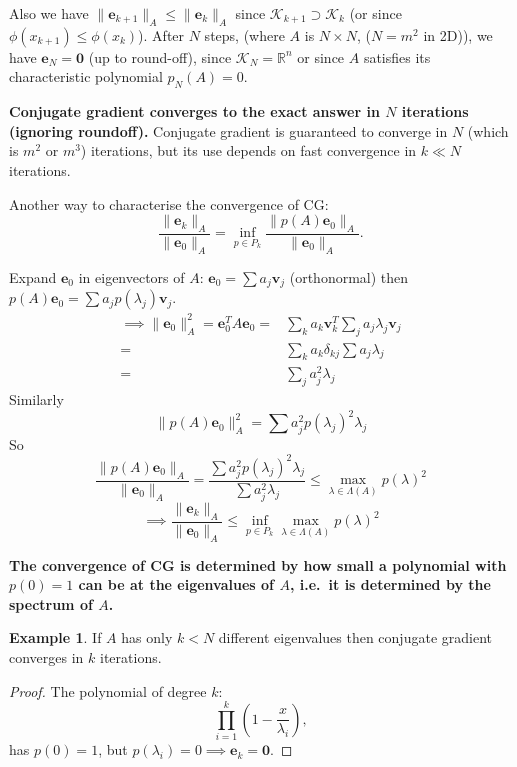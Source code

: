 \documentclass[12pt, a4paper]{article}
\renewcommand{\vec}[1]{\mathbf{#1}}
\def\R{\mathbb{R}}
\theoremstyle{definition}
\newtheorem{example}[thm]{Example}
\theoremstyle{remark}
\numberwithin{equation}{section}
\begin{document}
Also we have $\|\vec{e}_{k+1}\|_A \le \|\vec{e}_k\|_A$ since $\mathcal{K}_{k+1} \supset \mathcal{K}_k$ (or since $\phi(x_{k+1}) \le \phi(x_k)$).
After $N$ steps, (where $A$ is $N\times N$, ($N=m^2$ in 2D)), we have $\vec{e}_N=\vec{0}$ (up to round-off), 
since $\mathcal{K}_N = \R^n$ or since $A$ satisfies its characteristic polynomial $p_N(A)=0$.

{\bf Conjugate gradient converges to the exact answer in $N$ iterations (ignoring roundoff).}
Conjugate gradient is guaranteed to converge in $N$ (which is $m^2$ or $m^3$) iterations, but its use depends on fast convergence in $k \ll N$ iterations.

Another way to characterise the convergence of CG: 
\begin{equation*}
\frac{\|\vec{e}_k\|_A}{\|\vec{e}_0\|_A}=\inf_{p \in P_k} \frac{\|p(A)\vec{e}_0\|_A}{\|\vec{e}_0\|_A}.
\end{equation*}

Expand $\vec{e}_0$ in eigenvectors of $A$: $\vec{e}_0=\sum a_j \vec{v}_j$ (orthonormal) then $p(A)\vec{e}_0 = \sum a_j p(\lambda_j)\vec{v}_j$.
\begin{align*}
\implies \|\vec{e}_0\|^2_A = \vec{e}_0^T A \vec{e}_0=& \sum_k a_k \vec{v}_k^T \sum_j a_j \lambda_j \vec{v}_j\\
=& \sum_k a_k \delta_{kj} \sum a_j \lambda_j\\
=&\sum_j a_j^2 \lambda_j
\end{align*}
Similarly
\begin{equation*}
\|p(A)\vec{e}_0\|^2_A = \sum a_j^2 p(\lambda_j)^2\lambda_j
\end{equation*}
So
\begin{equation*}
\frac{\|p(A)\vec{e}_0\|_A}{\|\vec{e}_0\|_A} = \frac{\sum a_j^2 p(\lambda_j)^2 \lambda_j}{\sum a_j^2 \lambda_j} \le \max_{\lambda \in \Lambda(A)}p(\lambda)^2
\end{equation*}
\begin{equation*}
\implies \frac{\|\vec{e}_k\|_A}{\|\vec{e}_0\|_A} \le \inf_{p \in P_k} \max_{\lambda \in \Lambda(A)} p(\lambda)^2
\end{equation*}

{\bf The convergence of CG is determined by how small a polynomial with $p(0)=1$ can be at the eigenvalues of $A$, i.e.\ it is determined by the spectrum of $A$.}

\begin{example}
If $A$ has only $k <N$ different eigenvalues  then conjugate gradient converges in $k$ iterations.
\begin{proof}
The polynomial of degree $k$:
\begin{equation*}
\prod_{i=1}^k \left(1- \frac{x}{\lambda_i}\right),
\end{equation*}
has $p(0)=1$, but $p(\lambda_i)=0 \implies \vec{e}_k=\vec{0}.$
\end{proof}
\end{example}
\end{document}
